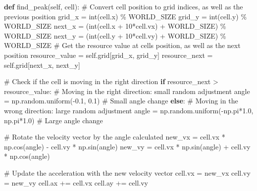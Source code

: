 \documentclass[
  letterpaper,
  DIV=11,
  numbers=noendperiod]{scrreprt}
\newenvironment{Shaded}{\begin{snugshade}}{\end{snugshade}}
\newcommand{\BuiltInTok}[1]{\textcolor[rgb]{0.00,0.23,0.31}{#1}}
\newcommand{\CommentTok}[1]{\textcolor[rgb]{0.37,0.37,0.37}{#1}}
\newcommand{\ControlFlowTok}[1]{\textcolor[rgb]{0.00,0.23,0.31}{\textbf{#1}}}
\newcommand{\DecValTok}[1]{\textcolor[rgb]{0.68,0.00,0.00}{#1}}
\newcommand{\FloatTok}[1]{\textcolor[rgb]{0.68,0.00,0.00}{#1}}
\newcommand{\KeywordTok}[1]{\textcolor[rgb]{0.00,0.23,0.31}{\textbf{#1}}}
\newcommand{\NormalTok}[1]{\textcolor[rgb]{0.00,0.23,0.31}{#1}}
\newcommand{\OperatorTok}[1]{\textcolor[rgb]{0.37,0.37,0.37}{#1}}
\newcommand{\VariableTok}[1]{\textcolor[rgb]{0.07,0.07,0.07}{#1}}
\theoremstyle{definition}
\theoremstyle{remark}
\begin{document}
\begin{Shaded}
\begin{Highlighting}[]
\KeywordTok{def}\NormalTok{ find\_peak(}\VariableTok{self}\NormalTok{, cell):}
        \CommentTok{\# Convert cell position to grid indices, as well as the previous position}
\NormalTok{        grid\_x }\OperatorTok{=} \BuiltInTok{int}\NormalTok{(cell.x) }\OperatorTok{\%}\NormalTok{ WORLD\_SIZE}
\NormalTok{        grid\_y }\OperatorTok{=} \BuiltInTok{int}\NormalTok{(cell.y) }\OperatorTok{\%}\NormalTok{ WORLD\_SIZE}
\NormalTok{        next\_x }\OperatorTok{=}\NormalTok{ (}\BuiltInTok{int}\NormalTok{(cell.x }\OperatorTok{+} \DecValTok{10}\OperatorTok{*}\NormalTok{cell.vx) }\OperatorTok{+}\NormalTok{ WORLD\_SIZE) }\OperatorTok{\%}\NormalTok{ WORLD\_SIZE }
\NormalTok{        next\_y }\OperatorTok{=}\NormalTok{ (}\BuiltInTok{int}\NormalTok{(cell.y }\OperatorTok{+} \DecValTok{10}\OperatorTok{*}\NormalTok{cell.vy) }\OperatorTok{+}\NormalTok{ WORLD\_SIZE) }\OperatorTok{\%}\NormalTok{ WORLD\_SIZE }
        \CommentTok{\# Get the resource value at cell\textquotesingle{}s position, as well as the next position}
\NormalTok{        resource\_value }\OperatorTok{=} \VariableTok{self}\NormalTok{.grid[grid\_x, grid\_y]}
\NormalTok{        resource\_next }\OperatorTok{=} \VariableTok{self}\NormalTok{.grid[next\_x, next\_y]}
        
        \CommentTok{\# Check if the cell is moving in the right direction}
        \ControlFlowTok{if}\NormalTok{ resource\_next }\OperatorTok{\textgreater{}}\NormalTok{ resource\_value:}
            \CommentTok{\# Moving in the right direction: small random adjustment}
\NormalTok{            angle }\OperatorTok{=}\NormalTok{ np.random.uniform(}\OperatorTok{{-}}\FloatTok{0.1}\NormalTok{, }\FloatTok{0.1}\NormalTok{)  }\CommentTok{\# Small angle change}
        \ControlFlowTok{else}\NormalTok{:}
            \CommentTok{\# Moving in the wrong direction: large random adjustment}
\NormalTok{            angle }\OperatorTok{=}\NormalTok{ np.random.uniform(}\OperatorTok{{-}}\NormalTok{np.pi}\OperatorTok{*}\FloatTok{1.0}\NormalTok{, np.pi}\OperatorTok{*}\FloatTok{1.0}\NormalTok{)  }\CommentTok{\# Large angle change}
        
        \CommentTok{\# Rotate the velocity vector by the angle calculated}
\NormalTok{        new\_vx }\OperatorTok{=}\NormalTok{ cell.vx }\OperatorTok{*}\NormalTok{ np.cos(angle) }\OperatorTok{{-}}\NormalTok{ cell.vy }\OperatorTok{*}\NormalTok{ np.sin(angle)}
\NormalTok{        new\_vy }\OperatorTok{=}\NormalTok{ cell.vx }\OperatorTok{*}\NormalTok{ np.sin(angle) }\OperatorTok{+}\NormalTok{ cell.vy }\OperatorTok{*}\NormalTok{ np.cos(angle)}
    
        \CommentTok{\# Update the acceleration with the new velocity vector}
\NormalTok{        cell.vx }\OperatorTok{=}\NormalTok{ new\_vx}
\NormalTok{        cell.vy }\OperatorTok{=}\NormalTok{ new\_vy}
\NormalTok{        cell.ax }\OperatorTok{+=}\NormalTok{ cell.vx}
\NormalTok{        cell.ay }\OperatorTok{+=}\NormalTok{ cell.vy}
\end{Highlighting}
\end{Shaded}
\end{document}
